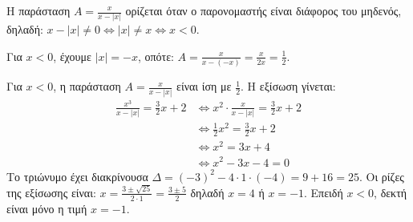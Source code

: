 
\begin{alist}
\item
\begin{rlist}
\item Η παράσταση $A = \frac{x}{x-|x|}$ ορίζεται όταν ο παρονομαστής είναι διάφορος του μηδενός, δηλαδή:
$x - |x| \ne 0 \Leftrightarrow |x| \ne x \Leftrightarrow x < 0$.
\item Για $x < 0$, έχουμε $|x| = -x$, οπότε:
$A = \frac{x}{x - (-x)} = \frac{x}{2x} = \frac{1}{2}$.
\end{rlist}
\item Για $x < 0$, η παράσταση $A = \frac{x}{x-|x|}$ είναι ίση με $\frac{1}{2}$.
Η εξίσωση γίνεται:
\begin{align*}
\frac{x^3}{x-|x|} = \frac{3}{2}x + 2 &\Leftrightarrow x^2 \cdot \frac{x}{x-|x|} = \frac{3}{2}x + 2 \\
&\Leftrightarrow \frac{1}{2}x^2 = \frac{3}{2}x + 2 \\
&\Leftrightarrow x^2 = 3x + 4 \\
&\Leftrightarrow x^2 - 3x - 4 = 0
\end{align*}
Το τριώνυμο έχει διακρίνουσα $\Delta = (-3)^2 - 4 \cdot 1 \cdot (-4) = 9 + 16 = 25$.
Οι ρίζες της εξίσωσης είναι:
$x = \frac{3 \pm \sqrt{25}}{2 \cdot 1} = \frac{3 \pm 5}{2}$ δηλαδή $x = 4$ ή $x = -1$.
Επειδή $x < 0$, δεκτή είναι μόνο η τιμή $x = -1$.
\end{alist}

